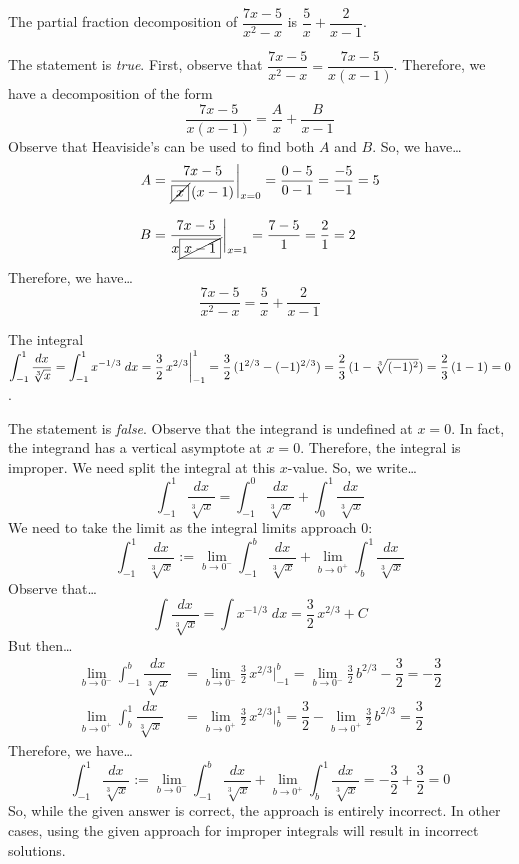 \documentclass[11pt,letterpaper]{article}
\begin{document}
 The partial fraction decomposition of $\dfrac{7x - 5}{x^2 - x}$ \;is\; $\dfrac{5}{x} + \dfrac{2}{x - 1}$. \pspace

\sol The statement is \textit{true}. First, observe that $\dfrac{7x - 5}{x^2 - x}= \dfrac{7x - 5}{x(x - 1)}$. Therefore, we have a decomposition of the form
	\[
	\dfrac{7x - 5}{x(x - 1)}= \dfrac{A}{x} + \dfrac{B}{x - 1}
	\]
Observe that Heaviside's can be used to find both $A$ and $B$. So, we have\dots
	\[
	\begin{aligned}
	A&= \dfrac{7x - 5}{\cancel{\boxed{x}}\, (x - 1)} \bigg|_{x= 0}= \dfrac{0 - 5}{0 -1}= \dfrac{-5}{-1}= 5 \\[0.3cm]
	B&= \dfrac{7x - 5}{x \cancel{\boxed{x - 1}}} \bigg|_{x= 1}= \dfrac{7 - 5}{1}= \dfrac{2}{1}= 2
	\end{aligned}
	\]
Therefore, we have\dots
	\[
	\dfrac{7x - 5}{x^2 - x}= \dfrac{5}{x} + \dfrac{2}{x - 1}
	\] \pvspace{1.3cm}



 The integral $\displaystyle\int_{-1}^1 \dfrac{dx}{\sqrt[3]{x}}= \int_{-1}^1 x^{-1/3} \;dx= \frac{3}{2} \, x^{2/3} \bigg|_{-1}^1= \frac{3}{2} \, (1^{2/3} - (-1)^{2/3})= \frac{2}{3} \, (1 - \sqrt[3]{(-1)^2})= \frac{2}{3} \, (1 - 1)= 0$. \pspace

\sol The statement is \textit{false}. Observe that the integrand is undefined at $x= 0$. In fact, the integrand has a vertical asymptote at $x= 0$. Therefore, the integral is improper. We need split the integral at this $x$-value. So, we write\dots
	\[
	\int_{-1}^1 \dfrac{dx}{\sqrt[3]{x}}= \int_{-1}^0 \dfrac{dx}{\sqrt[3]{x}} + \int_0^1 \dfrac{dx}{\sqrt[3]{x}}
	\]
We need to take the limit as the integral limits approach $0$:
	\[
	\int_{-1}^1 \dfrac{dx}{\sqrt[3]{x}}:= \lim_{b \to 0^-} \int_{-1}^b \dfrac{dx}{\sqrt[3]{x}} + \lim_{b \to 0^+} \int_b^1 \dfrac{dx}{\sqrt[3]{x}}
	\]
Observe that\dots
	\[
	\int \dfrac{dx}{\sqrt[3]{x}}= \int x^{-1/3} \;dx= \frac{3}{2}\,x^{2/3} + C
	\]
But then\dots
	\[
	\begin{aligned}
	\lim_{b \to 0^-} \int_{-1}^b \dfrac{dx}{\sqrt[3]{x}}&= \lim_{b \to 0^-} \frac{3}{2}\,x^{2/3} \bigg|_{-1}^b= \lim_{b \to 0^-} \frac{3}{2}\,b^{2/3} - \dfrac{3}{2}= -\dfrac{3}{2} \\[0.3cm]
	\lim_{b \to 0^+} \int_b^1 \dfrac{dx}{\sqrt[3]{x}}&= \lim_{b \to 0^+} \frac{3}{2}\,x^{2/3} \bigg|_b^1= \dfrac{3}{2} - \lim_{b \to 0^+} \frac{3}{2}\,b^{2/3}= \dfrac{3}{2}
	\end{aligned}
	\]
Therefore, we have\dots
	\[
	\int_{-1}^1 \dfrac{dx}{\sqrt[3]{x}}:= \lim_{b \to 0^-} \int_{-1}^b \dfrac{dx}{\sqrt[3]{x}} + \lim_{b \to 0^+} \int_b^1 \dfrac{dx}{\sqrt[3]{x}}= -\dfrac{3}{2} + \dfrac{3}{2}= 0
	\]
So, while the given answer is correct, the approach is entirely incorrect. In other cases, using the given approach for improper integrals will result in incorrect solutions. \pvspace{1.3cm} 



\end{document}
